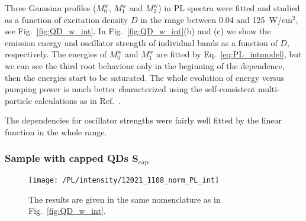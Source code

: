 Three Gaussian profiles ($M_0^\mathrm{w}$, $M_1^\mathrm{w}$ and $M_2^\mathrm{w}$) in PL spectra were fitted and studied as a function of excitation density $D$ in the range between 0.04 and 125~W/cm$^2$, see Fig.~\ref{fig:QD_w_int}. In Fig.~\ref{fig:QD_w_int}(b) and (c) we show the emission energy and oscillator strength of individual bands as a function of $D$, respectively. The energies of $M_0^\mathrm{w}$ and $M_1^\mathrm{w}$ are fitted by Eq.~\ref{eq:PL_intmodel}, but we can see the third root behaviour only in the beginning of the dependence, then the energies start to be saturated. The whole evolution of energy versus pumping power is much better characterized using the self-consistent multi-particle calculations as in Ref.~\citep{Klenovsky2017}.

The dependencies for oscillator strengths were fairly well fitted by the linear function in the whole range.




\subsubsection*{Sample with capped QDs $\mathbf{S_\mathrm{cap}}$}
\begin{figure}
	\centering
	\texttt{[image: /PL/intensity/12021\_1108\_norm\_PL\_int]}
	\caption{The results are given in the same nomenclature as in Fig.~\ref{fig:QD_w_int}.}
	\label{fig:QD_cap_int}
\end{figure}

